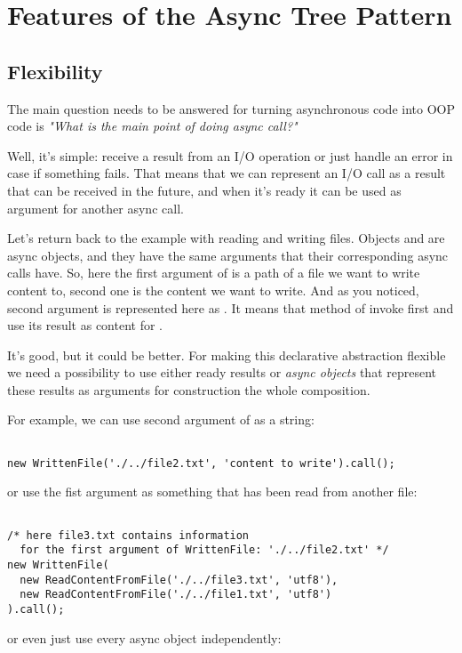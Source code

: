 \documentclass{article}
\newcommand{\cit}[1]{{\fontfamily{qcr}\selectfont{\textit{\textbf{\textcolor{darkgray}{#1}}}}}}
\begin{document}
\section{Features of the Async Tree Pattern}

\subsection{Flexibility}

The main question needs to be answered for turning asynchronous code into OOP code is \textit{"What is the main point of doing async call?"}

Well, it's simple: receive a result from an I/O operation or just handle an error in case if something fails. That means that we can represent an I/O call as a result that can be received in the future, and when it's ready it can be used as argument for another async call.

Let's return back to the example with reading and writing files. Objects \cit{WrittenFile} and \cit{ReadContentFromFile} are async objects, and they have the same arguments that their corresponding async calls have. So, here the first argument of \cit{WrittenFile} is a path of a file we want to write content to, second one is the content we want to write. And as you noticed, second argument is represented here as \cit{ReadContentFromFile}. It means that method \cit{call()} of \cit{WrittenFile} invoke first \cit{ReadContentFromFile} and use its result as content for \cit{WrittenFile}.

It's good, but it could be better. For making this declarative abstraction flexible we need a possibility to use either ready results or \textit{async objects} that represent these results as arguments for construction the whole composition.

For example, we can use second argument of \cit{WrittenFile} as a string:

\begin{lstlisting}

new WrittenFile('./../file2.txt', 'content to write').call();

\end{lstlisting}
or use the fist argument as something that has been read from another file:

\begin{lstlisting}

/* here file3.txt contains information 
  for the first argument of WrittenFile: './../file2.txt' */
new WrittenFile(
  new ReadContentFromFile('./../file3.txt', 'utf8'), 
  new ReadContentFromFile('./../file1.txt', 'utf8')
).call();

\end{lstlisting}
or even just use every async object independently:
\end{document}

